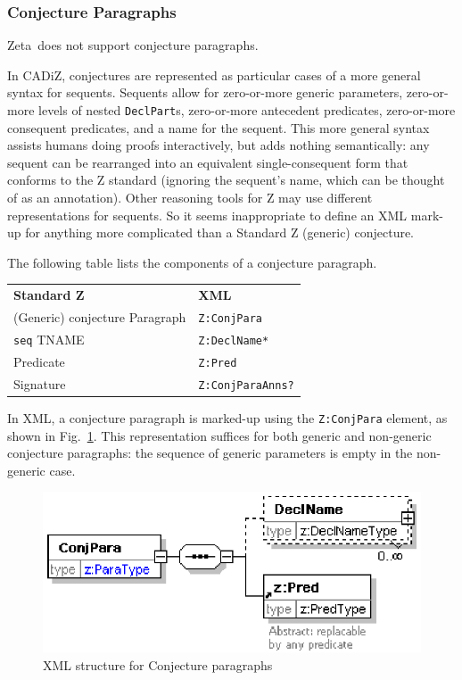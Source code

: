 \documentclass{llncs}  %
\newcommand{\AFont}[1]{\texttt{#1}}
\newcommand{\CADiZ}{CADiZ}
\newcommand{\Zeta}{Zeta}
\newcommand{\AParagraph}{Paragraph}
\newcommand{\APredicate}{Predicate}
\newcommand{\TNAME}{TNAME}
\newcommand{\ASignature}{Signature}
\begin{document}
\subsubsection{Conjecture Paragraphs}

\Zeta\ does not support conjecture paragraphs.

In \CADiZ, conjectures are represented as particular cases of
a more general syntax for sequents.
Sequents allow for zero-or-more generic parameters,
zero-or-more levels of nested \AFont{DeclPart}s,
zero-or-more antecedent predicates,
zero-or-more consequent predicates,
and a name for the sequent.
This more general syntax assists humans doing proofs interactively,
but adds nothing semantically: any sequent can be rearranged
into an equivalent single-consequent form that conforms to the Z standard
(ignoring the sequent's name, which can be thought of as an annotation).
Other reasoning tools for Z may use different representations for sequents.
So it seems inappropriate to define an XML mark-up for anything
more complicated than a Standard Z (generic) conjecture.

The following table lists the components of a conjecture paragraph.

\begin{center}
\begin{tabular}{|l|l|}
\hline
{\bf Standard Z} & {\bf XML}\\
(Generic) conjecture \AParagraph & \AFont{Z:ConjPara}\\
\hline
\AFont{seq} \TNAME & \AFont{Z:DeclName*}\\
\APredicate & \AFont{Z:Pred}\\
\ASignature & \AFont{Z:ConjParaAnns?}\\
\hline
\end{tabular}
\end{center}

In XML, a conjecture paragraph is marked-up using
the \AFont{Z:ConjPara} element, as shown in Fig.~\ref{fig:conjpara}.
This representation suffices for both generic and non-generic
conjecture paragraphs: the sequence of generic parameters is empty in the
non-generic case. 

\begin{figure}[htbp]
  \centering
  \includegraphics{conjpara.eps}
  \caption{XML structure for Conjecture paragraphs}
  \label{fig:conjpara}
\end{figure}
\end{document}
